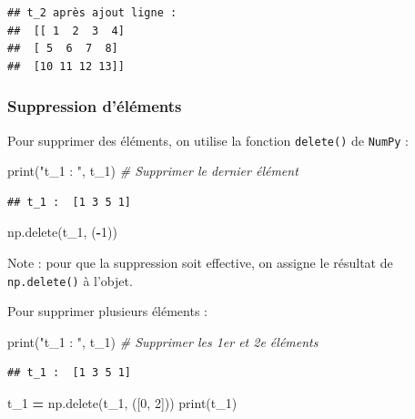 \documentclass[12pt,]{book}
\newenvironment{Shaded}{\begin{snugshade}}{\end{snugshade}}
\newcommand{\DecValTok}[1]{\textcolor[rgb]{0.00,0.00,0.81}{#1}}
\newcommand{\StringTok}[1]{\textcolor[rgb]{0.31,0.60,0.02}{#1}}
\newcommand{\CommentTok}[1]{\textcolor[rgb]{0.56,0.35,0.01}{\textit{#1}}}
\newcommand{\OperatorTok}[1]{\textcolor[rgb]{0.81,0.36,0.00}{\textbf{#1}}}
\newcommand{\BuiltInTok}[1]{#1}
\newcommand{\NormalTok}[1]{#1}
\numberwithin{equation}{section}
\numberwithin{countremarque}{section}
\begin{document}
\begin{lstlisting}
## t_2 après ajout ligne : 
##  [[ 1  2  3  4]
##  [ 5  6  7  8]
##  [10 11 12 13]]
\end{lstlisting}

\subsubsection{Suppression d'éléments}\label{suppression-delements-2}

Pour supprimer des éléments, on utilise la fonction \texttt{delete()} de
\texttt{NumPy} :

\begin{Shaded}
\begin{Highlighting}[]
\BuiltInTok{print}\NormalTok{(}\StringTok{"t_1 : "}\NormalTok{, t_1)}
\CommentTok{# Supprimer le dernier élément}
\end{Highlighting}
\end{Shaded}

\begin{lstlisting}
## t_1 :  [1 3 5 1]
\end{lstlisting}

\begin{Shaded}
\begin{Highlighting}[]
\NormalTok{np.delete(t_1, (}\OperatorTok{-}\DecValTok{1}\NormalTok{))}
\end{Highlighting}
\end{Shaded}

Note : pour que la suppression soit effective, on assigne le résultat de
\texttt{np.delete()} à l'objet.

Pour supprimer plusieurs éléments :

\begin{Shaded}
\begin{Highlighting}[]
\BuiltInTok{print}\NormalTok{(}\StringTok{"t_1 : "}\NormalTok{, t_1)}
\CommentTok{# Supprimer les 1er et 2e éléments}
\end{Highlighting}
\end{Shaded}

\begin{lstlisting}
## t_1 :  [1 3 5 1]
\end{lstlisting}

\begin{Shaded}
\begin{Highlighting}[]
\NormalTok{t_1 }\OperatorTok{=}\NormalTok{ np.delete(t_1, ([}\DecValTok{0}\NormalTok{, }\DecValTok{2}\NormalTok{]))}
\BuiltInTok{print}\NormalTok{(t_1)}
\end{Highlighting}
\end{Shaded}
\end{document}
